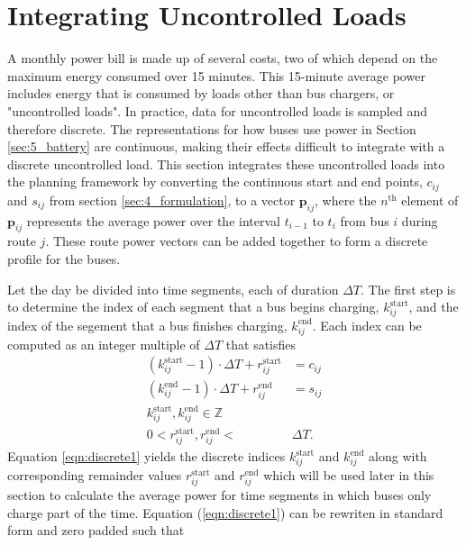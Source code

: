 \section{Integrating Uncontrolled Loads\label{sec:uncontrolled}}
A monthly power bill is made up of several costs, two of which depend on the maximum energy consumed over 15 minutes. This 15-minute average power includes energy that is consumed by loads other than bus chargers, or "uncontrolled loads". In practice, data for uncontrolled loads is sampled and therefore discrete. The representations for how buses use power in Section \ref{sec:5_battery} are continuous, making their effects difficult to integrate with a discrete uncontrolled load. This section integrates these uncontrolled loads into the planning framework by converting the continuous start and end points, $c_{ij}$ and $s_{ij}$ from section \ref{sec:4_formulation}, to a vector $\mathbf{p}_{ij}$, where the $n^{\text{th}}$ element of $\mathbf{p}_{ij}$ represents the average power over the interval $t_{i-1}$ to $t_i$ from bus $i$ during route $j$. These route power vectors can be added together to form a discrete profile for the buses.
\par Let the day be divided into time segments, each of duration $\Delta T$. The first step is to determine the index of each segment that a bus begins charging, $k_{ij}^{\text{start}}$, and the index of the segement that a bus finishes charging, $k_{ij}^{\text{end}}$.  Each index can be computed as an integer multiple of $\Delta T$ that satisfies 
\begin{equation} \label{eqn:discrete1} \begin{aligned}
	\left ( k^{\text{start}}_{ij} - 1 \right ) \cdot\Delta T + r^{\text{start}}_{ij}&= c_{ij} \\
	\left (	k^{\text{end}}_{ij} - 1 \right ) \cdot\Delta T + r^{\text{end}}_{ij}&= s_{ij} \\
	k^{\text{start}}_{ij}, k^{\text{end}}_{ij} \in \mathbb{Z} \\
	0 < r^{\text{start}}_{ij}, r^{\text{end}}_{ij} < &\Delta T.
\end{aligned} \end{equation} 
Equation \eqref{eqn:discrete1} yields the discrete indices $k_{ij}^{\text{start}}$ and $k_{ij}^{\text{end}}$ along with corresponding remainder values $r_{ij}^{\text{start}}$ and $r_{ij}^{\text{end}}$ which will be used later in this section to calculate the average power for time segments in which buses only charge part of the time.  Equation (\ref{eqn:discrete1}) can be rewriten in standard form and zero padded such that
